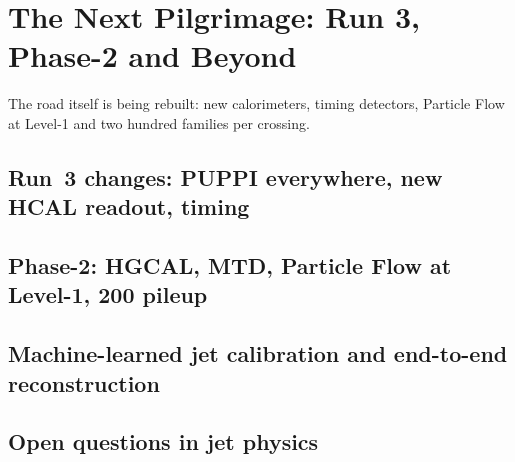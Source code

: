 \chapter{The Next Pilgrimage: Run 3, Phase-2 and Beyond}
\label{ch:next_pilgrimage}

\begin{journeybox}
The road itself is being rebuilt: new calorimeters, timing detectors, Particle
Flow at Level-1 and two hundred families per crossing.
\end{journeybox}


\section{Run~3 changes: PUPPI everywhere, new HCAL readout, timing}
\label{sec:next_pilgrimage:run_3_changes_puppi_everywhere_new_hcal_}

\section{Phase-2: HGCAL, MTD, Particle Flow at Level-1, 200 pileup}
\label{sec:next_pilgrimage:phase_2_hgcal_mtd_particle_flow_at_level}

\section{Machine-learned jet calibration and end-to-end reconstruction}
\label{sec:next_pilgrimage:machine_learned_jet_calibration_and_end_}

\section{Open questions in jet physics}
\label{sec:next_pilgrimage:open_questions_in_jet_physics}

\begin{pitfalls}
\end{pitfalls}

\begin{exercises}
\item {}
\item {}
\end{exercises}
